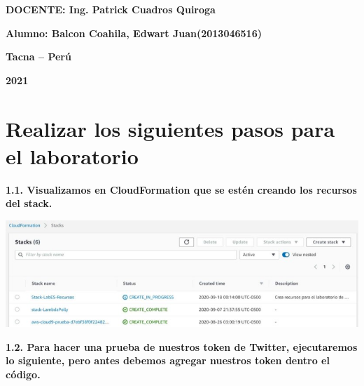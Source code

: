 \documentclass{article}
\begin{document}
\begin{titlepage}
\begin{center}
\vspace*{0.3in}
\begin{Large}
\textbf{DOCENTE: Ing. Patrick Cuadros Quiroga} \\
\end{Large}

\vspace*{0.2in}
\vspace*{0.1in}
\begin{large}

\begin{Large}
\textbf{Alumno: Balcon Coahila, Edwart Juan\hfill	(2013046516) } \\
\end{Large}

\vspace*{0.15in}
\begin{Large}
\textbf{Tacna – Perú} \\
\end{Large}

\vspace*{0.05in}
\begin{Large}
\textbf{2021 } \\
\end{Large}

\end{large}
\end{center}

\end{titlepage}


\newpage

\section{ Realizar los siguientes pasos para el laboratorio }

\textbf{1.1.  Visualizamos en CloudFormation que se estén creando los recursos del stack.}

\begin{center}
		\includegraphics[width=15cm]{./images/1} 
	\end{center}
	
\textbf{1.2. Para hacer una prueba de nuestros token de Twitter, ejecutaremos lo siguiente, pero antes debemos
agregar nuestros token dentro el código.}
\end{document}
